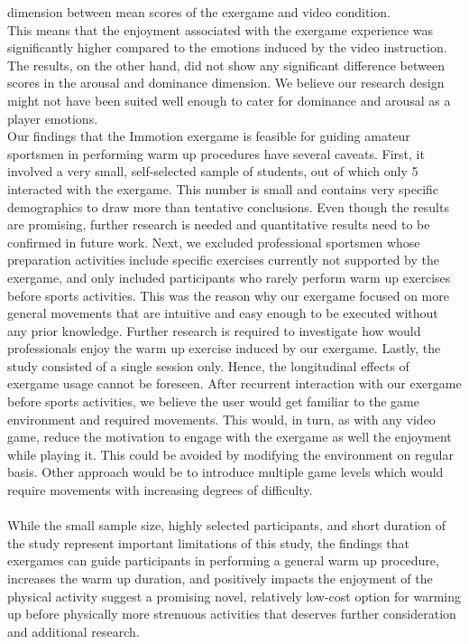 dimension between mean scores of the exergame and video condition. \\This means that the enjoyment associated with the exergame experience was significantly higher compared to the emotions induced by the video instruction. The results, on the other hand, did not show any significant difference between scores in the arousal and dominance dimension. We believe our research design might not have been suited well enough to cater for dominance and arousal as a player emotions.\\
Our findings that the Immotion exergame is feasible for guiding amateur sportsmen in performing warm up procedures have several caveats. First, it involved a very small, self-selected sample of students, out of which only 5  interacted with the exergame. This number is small and contains very specific demographics to draw more than tentative conclusions. Even though the results are promising, further research is needed and quantitative results need to be confirmed in future work. Next, we excluded professional sportsmen whose preparation activities include specific exercises currently not supported by the exergame, and only included participants who rarely perform warm up exercises before sports activities. This was the reason why our exergame focused on more general movements that are intuitive and easy enough to be executed without any prior knowledge.  Further research is required to investigate how would professionals enjoy the warm up exercise induced by our exergame. Lastly, the study consisted of a single session only. Hence, the longitudinal effects of exergame usage cannot be foreseen. After recurrent interaction with our exergame before sports activities, we believe the user would get familiar to the game environment  and required movements. This would, in turn, as with any video game, reduce the motivation to  engage with the exergame as well the enjoyment while playing it. This could be avoided by modifying the environment on regular basis. Other approach would be to introduce multiple  game levels which would require movements with increasing degrees of difficulty.\\\\
While the small sample size, highly selected participants, and short duration of the study represent important limitations of this study, the findings that exergames can guide participants in performing a general warm up procedure, increases the warm up duration, and positively impacts the enjoyment of the physical activity suggest a promising novel, relatively low-cost option for warming up before physically more strenuous activities that deserves further consideration and additional research.